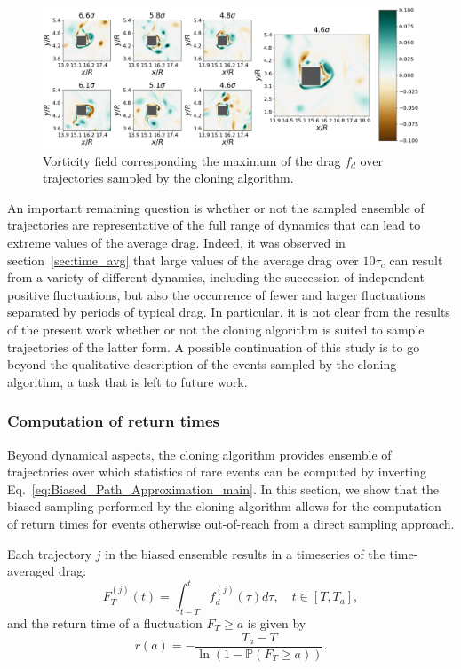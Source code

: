 \documentclass{jfm}
\begin{document}
\begin{figure}
  \centering
  \includegraphics[width=\linewidth]{illustr_extrms_vorticity_GKTL/illustr_extrms_vorticity_GKTL}
  \caption{Vorticity field corresponding the maximum of the drag $f_d$ over trajectories sampled by the cloning algorithm.}
  \label{fig:illustr_extrms_vorticity_GKTL}
\end{figure}

An important remaining question is whether or not the sampled ensemble of trajectories are representative of the full range of dynamics that can lead to extreme values of the average drag.
Indeed, it was observed in section~\ref{sec:time_avg} that large values of the average drag over $10\tau_c$ can result from a variety of different
dynamics, including the succession of independent positive fluctuations, but also the occurrence of fewer and larger fluctuations separated by periods of typical drag.
In particular, it is not clear from the results of the present work whether or not the cloning algorithm is suited to sample trajectories of the latter form.
A possible continuation of this study is to go beyond the qualitative description of the events sampled by the cloning algorithm, a task that is left to future work.

\subsubsection{Computation of return times}
\label{sec:return_times}

Beyond dynamical aspects, the cloning algorithm provides ensemble of trajectories over which statistics of rare events can be computed by inverting Eq.~\eqref{eq:Biased_Path_Approximation_main}.
In this section, we show that the biased sampling performed by the cloning algorithm allows for the computation of return times for events otherwise out-of-reach from a direct sampling approach.

Each trajectory $j$ in the biased ensemble results in a timeseries of the time-averaged drag:
\begin{equation}
\label{eq:time_averaged}
F_T^{(j)}(t) = \int_{t-T}^{t}f_d^{(j)}(\tau)d\tau, \quad t\in [T,T_a]  ,
\end{equation}
and the return time of a fluctuation $F_T \geq a$ is given by~\citep{lestang_computing_2018}
\begin{equation}
r(a) = - \frac{T_a - T}{\ln (1-\mathbb{P}(F_T \geq a))}.
\end{equation}
\end{document}
